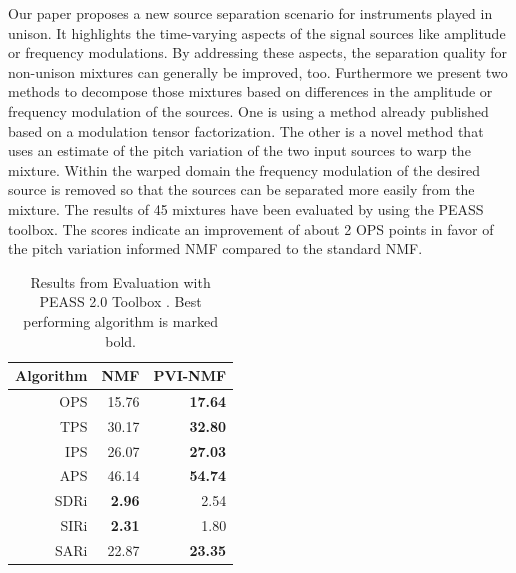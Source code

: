 Our paper proposes a new source separation scenario for instruments played in unison. It highlights the time-varying aspects of the signal sources like amplitude or frequency modulations. By addressing these aspects, the separation quality for non-unison mixtures can generally be improved, too.
Furthermore we present two methods to decompose those mixtures based on differences in the amplitude or frequency modulation of the sources. One is using a method already published based on a modulation tensor factorization. The other is a novel method that uses an estimate of the pitch variation of the two input sources to warp the mixture. Within the warped domain the frequency modulation of the desired source is removed so that the sources can be separated more easily from the mixture. The results of 45 mixtures have been evaluated by using the PEASS toolbox. The scores indicate an improvement of about 2 OPS points in favor of the pitch variation informed NMF compared to the standard NMF.

\begin{table}
\begin{center}
\small
\begin{tabular}{ r | r r }
  Algorithm & NMF & PVI-NMF \\
  \hline
  OPS & 15.76 & \textbf{17.64}\\
  TPS & 30.17 & \textbf{32.80}\\
  IPS & 26.07 & \textbf{27.03}\\
  APS & 46.14 & \textbf{54.74}\\
  \hline
  SDRi & \textbf{2.96} & 2.54 \\
  SIRi & \textbf{2.31} & 1.80 \\
  SARi & 22.87 & \textbf{23.35} \\
\end{tabular}
\end{center}
  \caption{Results from Evaluation with PEASS 2.0 Toolbox \cite{emiya11}. Best performing algorithm is marked bold.}
  \label{tab:results}
\end{table}

